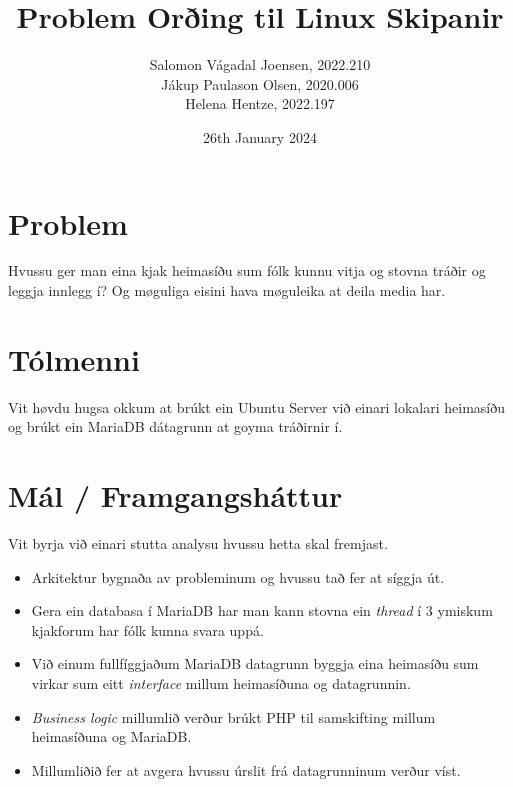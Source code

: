 \documentclass{article}
\title{Problem Orðing til Linux Skipanir}
\author{Salomon Vágadal Joensen, 2022.210\\Jákup Paulason Olsen, 2020.006\\Helena Hentze, 2022.197}
\date{26th January 2024}
\begin{document}
\maketitle

\section{Problem}
Hvussu ger man eina kjak heimasíðu sum fólk kunnu vitja og stovna tráðir og leggja innlegg í? Og møguliga eisini hava møguleika at deila media har.

\section{Tólmenni}
Vit høvdu hugsa okkum at brúkt ein Ubuntu Server við einari lokalari heimasíðu og brúkt ein MariaDB dátagrunn at goyma tráðirnir í.

\section{Mál / Framgangsháttur}
Vit byrja við einari stutta analysu hvussu hetta skal fremjast.
\begin{itemize}
    \item Arkitektur bygnaða av probleminum og hvussu tað fer at síggja út.
    \item Gera ein databasa í MariaDB har man kann stovna ein \textit{thread} í 3 ymiskum kjakforum har fólk kunna svara uppá.
    \item Við einum fullfíggjaðum MariaDB datagrunn byggja eina heimasíðu sum virkar sum eitt \textit{interface} millum heimasíðuna og datagrunnin.
    \item \textit{Business logic} millumlið verður brúkt PHP til samskifting millum heimasíðuna og MariaDB.
    \item Millumliðið fer at avgera hvussu úrslit frá datagrunninum verður víst.
    
\end{itemize}
\end{document}
